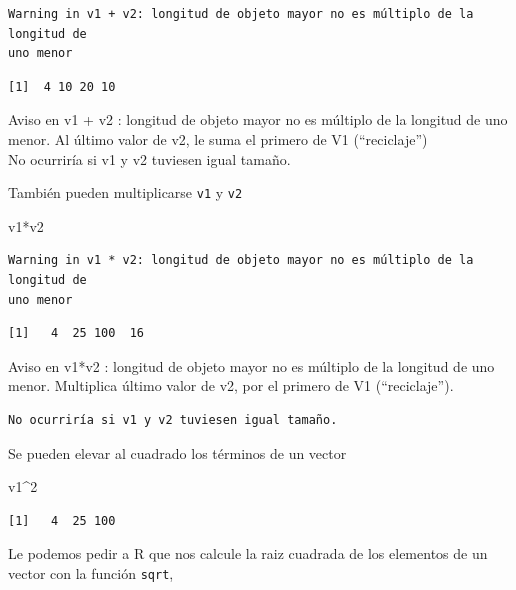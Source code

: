 \documentclass[
  letterpaper,
]{scrbook}
\newenvironment{Shaded}{\begin{snugshade}}{\end{snugshade}}
\newcommand{\DecValTok}[1]{\textcolor[rgb]{0.68,0.00,0.00}{#1}}
\newcommand{\NormalTok}[1]{\textcolor[rgb]{0.00,0.23,0.31}{#1}}
\newcommand{\SpecialCharTok}[1]{\textcolor[rgb]{0.37,0.37,0.37}{#1}}
\begin{document}
\begin{verbatim}
Warning in v1 + v2: longitud de objeto mayor no es múltiplo de la longitud de
uno menor
\end{verbatim}

\begin{verbatim}
[1]  4 10 20 10
\end{verbatim}

Aviso en v1 + v2 : longitud de objeto mayor no es múltiplo de la
longitud de uno menor. Al último valor de v2, le suma el primero de V1
(``reciclaje'')\\
No ocurriría si v1 y v2 tuviesen igual tamaño.

También pueden multiplicarse \texttt{v1} y \texttt{v2}

\begin{Shaded}
\begin{Highlighting}[]
\NormalTok{v1}\SpecialCharTok{*}\NormalTok{v2}
\end{Highlighting}
\end{Shaded}

\begin{verbatim}
Warning in v1 * v2: longitud de objeto mayor no es múltiplo de la longitud de
uno menor
\end{verbatim}

\begin{verbatim}
[1]   4  25 100  16
\end{verbatim}

Aviso en v1*v2 : longitud de objeto mayor no es múltiplo de la longitud
de uno menor. Multiplica último valor de v2, por el primero de V1
(``reciclaje'').

\begin{verbatim}
No ocurriría si v1 y v2 tuviesen igual tamaño.
\end{verbatim}

Se pueden elevar al cuadrado los términos de un vector

\begin{Shaded}
\begin{Highlighting}[]
\NormalTok{v1}\SpecialCharTok{\^{}}\DecValTok{2} 
\end{Highlighting}
\end{Shaded}

\begin{verbatim}
[1]   4  25 100
\end{verbatim}

Le podemos pedir a R que nos calcule la raiz cuadrada de los elementos
de un vector con la función \texttt{sqrt},
\end{document}
